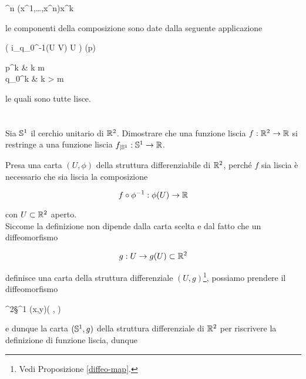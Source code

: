 %
	{\R^{n}}{\R}%
	{(x^{1},\dots,x^{n})}{x^{k}}
	
le componenti della composizione sono date dalla seguente applicazione

%
	{\phi( i_{q_{0}}^{-1}(U \times V) \cap U )}{\R}%
	{\phi(p)}{%
		\begin{cases}
			p^{k} & k \leqslant m\\
			q_{0}^{k} & k > m
		\end{cases}%
	}

le quali sono tutte lisce.

%

\newpage

%

\section{}\label{es2-7}

\begin{tcolorbox}
	Sia $ \S^{1} $ il cerchio unitario di $ \R^{2} $. Dimostrare che una funzione liscia $ f : \R^{2} \to \R $ si restringe a una funzione liscia $ f_{|\S^{1}} : \S^{1} \to \R $.
\end{tcolorbox}

Presa una carta $ (U,\phi) $ della struttura differenziabile di $ \R^{2} $, perché $ f $ sia liscia è necessario che sia liscia la composizione

\begin{equation}
	f \circ \phi^{-1} : \phi(U) \to \R
\end{equation}

con $ U \subset \R^{2} $ aperto.\\
Siccome la definizione non dipende dalla carta scelta e dal fatto che un diffeomorfismo

\begin{equation}
	g : U \to g(U) \subset \R^{2}
\end{equation}

definisce una carta della struttura differenziale $ (U,g) $\footnote{%
	Vedi Proposizione \ref{diffeo-map}.%
}, possiamo prendere il diffeomorfismo

%
	{\R^{2}}{\S^{1}}%
	{(x,y)}{\left( , \right)}
	
e dunque la carta $ (\S^{1},g) $ della struttura differenziale di $ \R^{2} $ per riscrivere la definizione di funzione liscia, dunque

